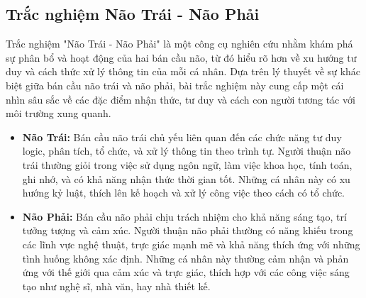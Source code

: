 \subsection{Trắc nghiệm Não Trái - Não Phải}

Trắc nghiệm "Não Trái - Não Phải" là một công cụ nghiên cứu nhằm khám phá sự phân bổ và hoạt động của hai bán cầu não, từ đó hiểu rõ hơn về xu hướng tư duy và cách thức xử lý thông tin của mỗi cá nhân. Dựa trên lý thuyết về sự khác biệt giữa bán cầu não trái và não phải, bài trắc nghiệm này cung cấp một cái nhìn sâu sắc về các đặc điểm nhận thức, tư duy và cách con người tương tác với môi trường xung quanh.

\begin{itemize}
  \item \textbf{Não Trái:} Bán cầu não trái chủ yếu liên quan đến các chức năng tư duy logic, phân tích, tổ chức, và xử lý thông tin theo trình tự. Người thuận não trái thường giỏi trong việc sử dụng ngôn ngữ, làm việc khoa học, tính toán, ghi nhớ, và có khả năng nhận thức thời gian tốt. Những cá nhân này có xu hướng kỷ luật, thích lên kế hoạch và xử lý công việc theo cách có tổ chức.
  
  \item \textbf{Não Phải:} Bán cầu não phải chịu trách nhiệm cho khả năng sáng tạo, trí tưởng tượng và cảm xúc. Người thuận não phải thường có năng khiếu trong các lĩnh vực nghệ thuật, trực giác mạnh mẽ và khả năng thích ứng với những tình huống không xác định. Những cá nhân này thường cảm nhận và phản ứng với thế giới qua cảm xúc và trực giác, thích hợp với các công việc sáng tạo như nghệ sĩ, nhà văn, hay nhà thiết kế.
\end{itemize}

